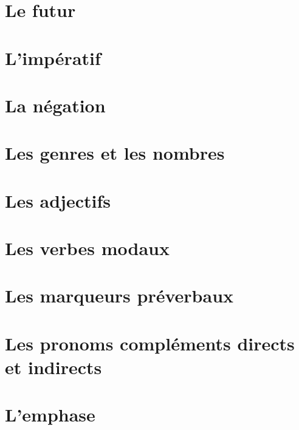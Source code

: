 \documentclass[draft]{book}
\begin{document}




\tableofcontents
















\chapter{Le futur}

\chapter{L'impératif}

\chapter{La négation}

\chapter{Les genres et les nombres}

\chapter{Les adjectifs}



\chapter{Les verbes modaux}\label{VerbMod}

\chapter{Les marqueurs préverbaux}\label{MarqPVer}

\chapter{Les pronoms compléments directs et indirects} \label{PronCompl}

\chapter{L'emphase}\label{Emphase}
\end{document}
